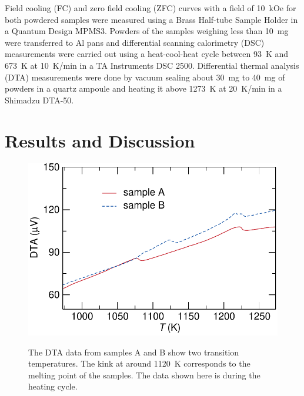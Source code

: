 \documentclass[letterpaper,10pt,doublespacing,edeposit]{uiucthesis2020}
\begin{document}
\begin{mainmatter}
Field cooling (FC) and zero field cooling (ZFC) curves with a field of 10~kOe for both powdered samples were measured using a Brass Half-tube Sample Holder in a Quantum Design MPMS3. Powders of the samples weighing less than 10~mg were transferred to Al pans and differential scanning calorimetry (DSC) measurements were carried out using a heat-cool-heat cycle between 93~K and 673~K at 10~K/min in a TA Instruments DSC 2500. Differential thermal analysis (DTA) measurements were done by vacuum sealing about 30~mg to 40~mg of powders in a quartz ampoule and heating it above 1273~K at 20~K/min in a Shimadzu DTA-50.


\section{Results and Discussion}


\begin{figure}
\centering\includegraphics[width=0.7\columnwidth]{figures/ch7/DTA_plots_cropped.pdf} \\
\caption{\label{fig:DTA}
The DTA data from samples A and B show two transition temperatures. The kink at around 1120~K corresponds to the melting point of the samples. The data shown here is during the heating cycle. %
} 
\end{figure}


\end{mainmatter}
\end{document}

